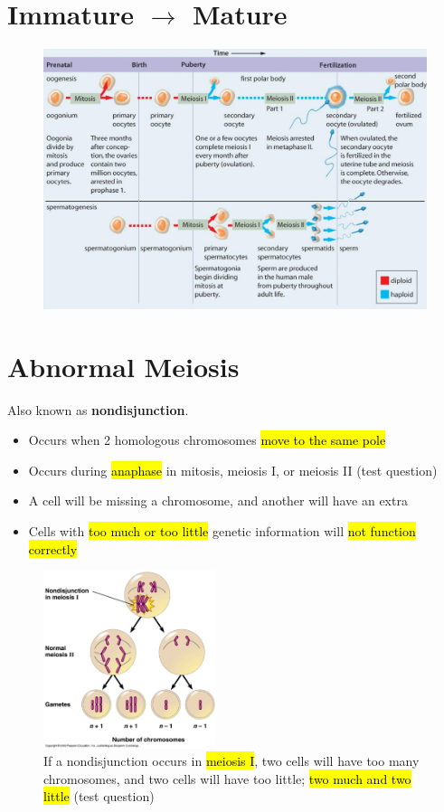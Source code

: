 \documentclass[a4paper,12pt]{article}
\begin{document}
\section{Immature $\longrightarrow$ Mature}
\begin{figure}[H]
    \centering
    \includegraphics[width=\textwidth]{genesis}
\end{figure}

\section{Abnormal Meiosis}
Also known as \textbf{nondisjunction}.
\begin{itemize}
    \item{Occurs when 2 homologous chromosomes \hl{move to the same pole}}
    \item{Occurs during \hl{anaphase} in mitosis, meiosis I, or meiosis II (test question)}
    \item{A cell will be missing a chromosome, and another will have an extra}
    \item{Cells with \hl{too much or too little} genetic information will \hl{not function correctly}}
\end{itemize}

\begin{figure}[H]
    \centering
    \includegraphics[width=0.45\textwidth]{nonj1}
    \caption{If a nondisjunction occurs in \hl{meiosis I}, two cells will have too many chromosomes, and two cells will have too little; \hl{two much and two little} (test question)}
\end{figure}
\end{document}
